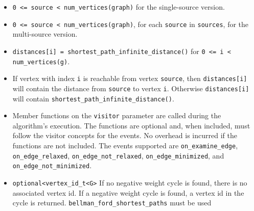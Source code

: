 \begin{itemdescr}
      \pnum\mandates
            \begin{itemize}
                  \item
                        \lstinline{0 <= source < num_vertices(graph)} for the single-source version. 
                  \item
                        \lstinline{0 <= source < num_vertices(graph)}, for each \lstinline{source} in \lstinline{sources}, 
                                   for the multi-source version.
            \end{itemize}
      \pnum\preconditions
            \begin{itemize}
                  \item
                        \lstinline{distances[i] = shortest_path_infinite_distance()} for \lstinline{0 <= i < num_vertices(g)}.
            \end{itemize}
      \pnum\effects
            \begin{itemize}
                  \item
                        If vertex with index \lstinline{i} is reachable from vertex \lstinline{source}, then
                        \lstinline{distances[i]} will contain the distance from \lstinline{source} to vertex
                        \lstinline{i}.  Otherwise \lstinline{distances[i]} will contain
                        \lstinline{shortest_path_infinite_distance()}.
                  \item Member functions on the \lstinline{visitor} parameter are called during the algorithm's execution.
                        The functions are optional and, when included, must follow the visitor concepts for the events.
                        No overhead is incurred if the functions are not included.
                        The events supported are \lstinline{on_examine_edge}, \lstinline{on_edge_relaxed}, \lstinline{on_edge_not_relaxed},
                        \lstinline{on_edge_minimized}, and \lstinline{on_edge_not_minimized}.
            \end{itemize}
      \pnum\returns 
      \begin{itemize}
            \item \lstinline{optional<vertex_id_t<G>} If no negative weight cycle is found, 
                  there is no associated vertex id. If a negative weight cycle is found, a
                  vertex id in the cycle is returned. \lstinline{bellman_ford_shortest_paths} must be used

\end{itemize}
\end{itemdescr}
